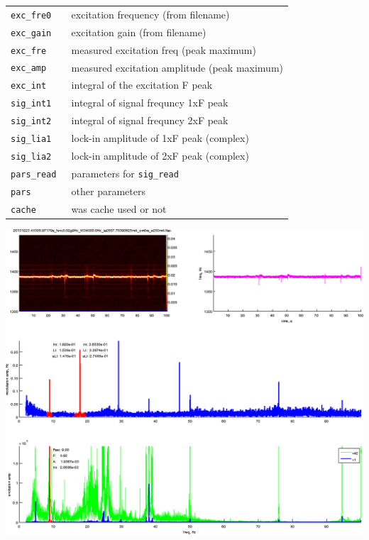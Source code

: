 \documentclass[a4paper]{article}
\begin{document}
\medskip\noindent
\begin{tabular}{p{3cm}p{14cm}}\hline
\tt exc\_fre0  & excitation frequency (from filename)\\
\tt exc\_gain  & excitation gain (from filename)\\
\tt exc\_fre   & measured excitation freq (peak maximum)\\
\tt exc\_amp   & measured excitation amplitude (peak maximum)\\
\tt exc\_int   & integral of the excitation F peak\\
\tt sig\_int1  & integral of signal frequncy 1xF peak\\
\tt sig\_int2  & integral of signal frequncy 2xF peak\\
\tt sig\_lia1  & lock-in amplitude of 1xF peak (complex)\\
\tt sig\_lia2  & lock-in amplitude of 2xF peak (complex)\\
\tt pars\_read & parameters for {\tt sig\_read}\\
\tt pars       & other parameters\\
\tt cache      & was cache used or not\\
\hline
\end{tabular}
\medskip

\medskip{}

\medskip
\noindent
\includegraphics[width=\textwidth]{sig_freq}
\end{document}
